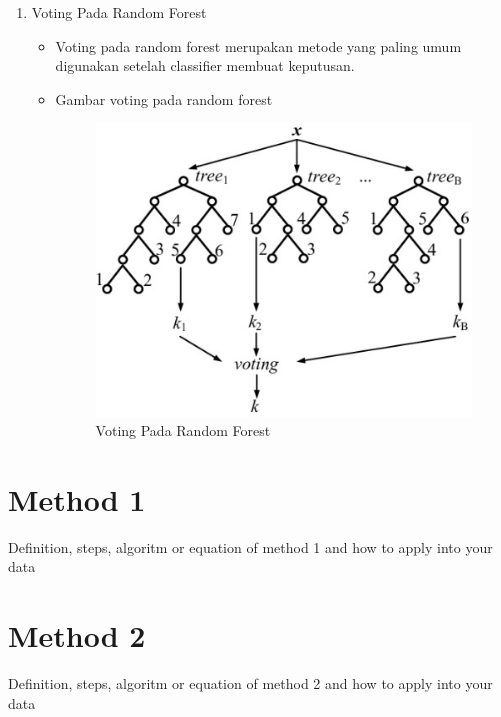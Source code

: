 \begin{enumerate}
\item Voting Pada Random Forest
	\begin{itemize}
		\item Voting pada random forest merupakan metode yang paling umum digunakan setelah classifier membuat keputusan.
		\item Gambar voting pada random forest
			\begin{figure}[ht]
			\centering
			\includegraphics[scale=0.5]{figures/j3.jpg}
			\caption{Voting Pada Random Forest}
			\label{contoh}
			\end{figure}
	\end{itemize}

\end{enumerate}


\section{Method 1}
Definition, steps, algoritm or equation of method 1 and how to apply into your data
\section{Method 2}
Definition, steps, algoritm or equation of method 2 and how to apply into your data
